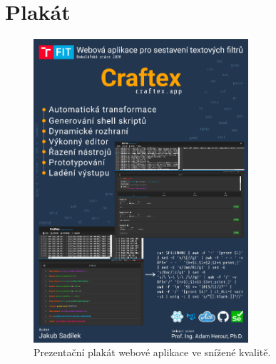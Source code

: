 \chapter{Plakát}
\begin{figure}[H]
	\centering
	\setlength{\fboxsep}{0pt}
	\includegraphics[width=0.71\textwidth]{obrazky-figures/Plakat_zredukovany.PNG}
	\caption{Prezentační plakát webové aplikace ve snížené kvalitě.}
\end{figure}

